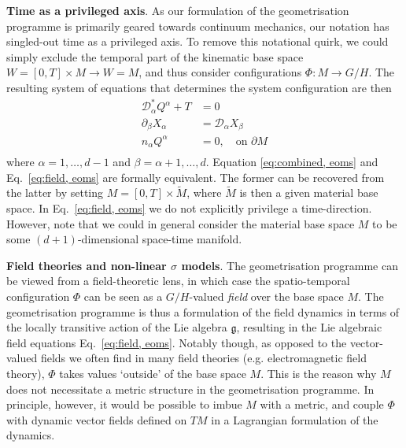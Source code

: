 \textbf{Time as a privileged axis}. As our formulation of the geometrisation programme is primarily geared towards continuum mechanics, our notation has singled-out time as a privileged axis. To remove this notational quirk, we could simply exclude the temporal part of the kinematic base space $W = [0, T] \times M \to W = M$, and thus consider configurations $\Phi : M \to G/H$. The resulting system of equations that determines the system configuration are then
\begin{subequations} \label{eq:field, eoms}
\begin{align}
\mathcal{D}^*_\alpha Q^\alpha + T & = 0 \\
\partial_\beta X_\alpha & = \mathcal{D}_\alpha X_\beta \label{eq:field, spatial integrability} \\
n_\alpha Q^\alpha & = 0, \quad \text{on } \partial M \label{eq:field, boundary conditions} \\
\end{align}
\end{subequations}
where $\alpha = 1, \dots, d-1$ and $\beta = \alpha+1, \dots, d$. Equation \ref{eq:combined, eoms} and Eq.~\ref{eq:field, eoms} are formally equivalent. The former can be recovered from the latter by setting $M = [0, T] \times \tilde{M}$, where $\tilde{M}$ is then a given material base space. In Eq.~\ref{eq:field, eoms} we do not explicitly privilege a time-direction. However, note that we could in general consider the material base space $M$ to be some $(d+1)$-dimensional space-time manifold.

\textbf{Field theories and non-linear $\sigma$ models}. The geometrisation programme can be viewed from a field-theoretic lens, in which case the spatio-temporal configuration $\Phi$ can be seen as a $G/H$-valued \textit{field} over the base space $M$. The geometrisation programme is thus a formulation of the field dynamics in terms of the locally transitive action of the Lie algebra $\mathfrak{g}$, resulting in the Lie algebraic field equations Eq.~\ref{eq:field, eoms}. Notably though, as opposed to the vector-valued fields we often find in many field theories (e.g. electromagnetic field theory), $\Phi$ takes values `outside' of the base space $M$. This is the reason why $M$ does not necessitate a metric structure in the geometrisation programme. In principle, however, it would be possible to imbue $M$ with a metric, and couple $\Phi$ with dynamic vector fields defined on $TM$ in a Lagrangian formulation of the dynamics.

